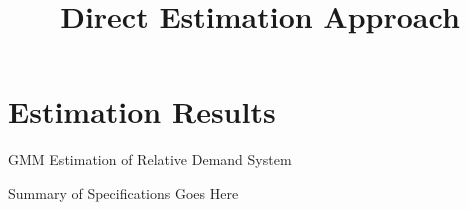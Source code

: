 \documentclass{article}
\title{Direct Estimation Approach}
\author{}
\begin{document}
\maketitle
\section*{Estimation Results}



\begin{table}\footnotesize\caption{GMM Estimation of Relative Demand System}
    \begin{center}
        
        \captionsetup{width=0.7\textwidth}
        \caption*{Summary of Specifications Goes Here}
    \end{center}
    \end{table}
\end{document}
